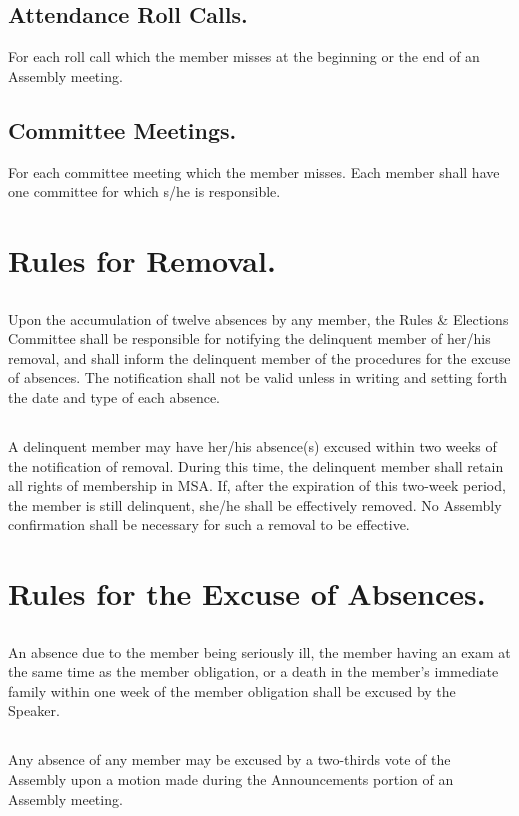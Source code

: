 \documentclass{rules}
\begin{document}
\subsection{Attendance Roll Calls.}
For each roll call which the member misses at the beginning or the end of an Assembly meeting.
\subsection{Committee Meetings.}
For each committee meeting which the member misses. Each member shall have one committee for which s/he is responsible.

\section{Rules for Removal.}
\subsection{}
Upon the accumulation of twelve absences by any member, the Rules \& Elections Committee shall be responsible for notifying the delinquent member of her/his removal, and shall inform the delinquent member of the procedures for the excuse of absences.  The notification shall not be valid unless in writing and setting forth the date and type of each absence.
\subsection{}
A delinquent member may have her/his absence(s) excused within two weeks of the notification of removal.  During this time, the delinquent member shall retain all rights of membership in MSA.  If, after the expiration of this two-week period, the member is still delinquent, she/he shall be effectively removed.  No Assembly confirmation shall be necessary for such a removal to be effective.

\section{Rules for the Excuse of Absences.}
\subsection{}
An absence due to the member being seriously ill, the member having an exam at the same time as the member obligation, or a death in the member's immediate family within one week of the member obligation shall be excused by the Speaker.
\subsection{}
Any absence of any member may be excused by a two-thirds vote of the Assembly upon a motion made during the Announcements portion of an Assembly meeting.
\end{document}
